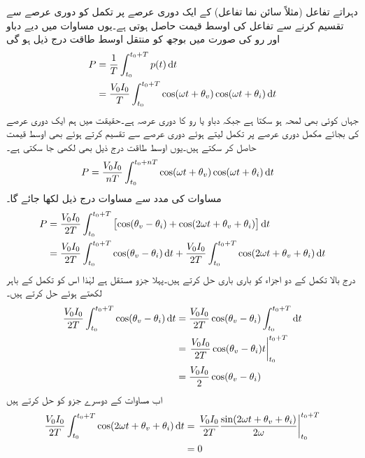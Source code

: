 دہراتے تفاعل (مثلاً سائن نما تفاعل) کے ایک دوری عرصے پر تکمل کو دوری عرصے سے تقسیم کرنے سے تفاعل کی اوسط قیمت حاصل ہوتی ہے۔یوں مساوات  میں دیے دباو اور رو کی صورت میں بوجھ کو منتقل اوسط طاقت درج ذیل ہو گی
\begin{gather}
\begin{aligned}\label{مساوات_طاقت_اوسط_تکمل_الف}
P&=\frac{1}{T}\int_{t_0}^{t_0+T} p(t) \dif t\\
&=\frac{V_0 I_0}{T}\int_{t_0}^{t_0+T} \cos(\omega t +\theta_v) \cos(\omega t +\theta_i) \dif t
\end{aligned}
\end{gather}    
جہاں  کوئی بھی لمحہ ہو سکتا ہے جبکہ  دباو یا رو کا دوری عرصہ ہے۔حقیقت میں ہم ایک دوری عرصے کی بجائے   مکمل دوری عرصے پر تکمل لیتے ہوئے  دوری عرصے سے تقسیم کرتے ہوئے بھی اوسط قیمت حاصل کر سکتے ہیں۔یوں اوسط طاقت درج ذیل بھی لکھی جا سکتی ہے۔
\begin{align}
P&=\frac{V_0 I_0}{nT}\int_{t_0}^{t_0+nT} \cos(\omega t +\theta_v) \cos(\omega t +\theta_i) \dif t
\end{align} 
مساوات  کی مدد سے مساوات  درج ذیل لکھا جائے گا۔
\begin{gather}
\begin{aligned}\label{مساوات_طاقت_اوسط_تکمل_ب}
P&=\frac{V_0 I_0}{2T}\int_{t_0}^{t_0+T} \left[\cos(\theta_v-\theta_i)+\cos(2\omega t +\theta_v+\theta_i)\right] \dif t\\
&=\frac{V_0 I_0}{2T}\int_{t_0}^{t_0+T} \cos(\theta_v-\theta_i) \dif t+\frac{V_0 I_0}{2T}\int_{t_0}^{t_0+T} \cos(2\omega t +\theta_v+\theta_i)\dif t
\end{aligned}
\end{gather} 
درج بالا تکمل کے دو اجزاء کو باری باری حل کرتے ہیں۔پہلا جزو مستقل ہے لہٰذا اس کو تکمل کے باہر لکھتے ہوئے حل کرتے ہیں۔
\begin{align*}
\frac{V_0 I_0}{2T}\int_{t_0}^{t_0+T} \cos(\theta_v-\theta_i) \dif t&=\frac{V_0 I_0}{2T}\cos(\theta_v-\theta_i) \int_{t_0}^{t_0+T} \dif t\\
&=\left. \frac{V_0 I_0}{2T}\cos(\theta_v-\theta_i) t\right|_{t_0}^{t_0+T}\\
&=\frac{V_0 I_0}{2}\cos(\theta_v-\theta_i)
\end{align*}
اب مساوات  کے دوسرے جزو کو حل کرتے ہیں
\begin{align*}
\frac{V_0 I_0}{2T}\int_{t_0}^{t_0+T} \cos(2\omega t +\theta_v+\theta_i)\dif t&=\left. \frac{V_0 I_0}{2T}\frac{ \sin(2\omega t +\theta_v+\theta_i)}{2\omega}\right|_{t_0}^{t_0+T}\\
&=0
\end{align*}
